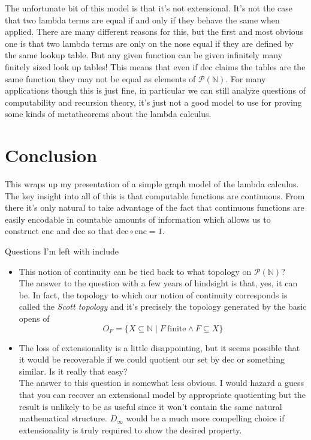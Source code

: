 \documentclass{amsart}
\newcommand{\enc}{\text{enc}}
\newcommand{\dec}{\text{dec}}
\begin{document}
The unfortunate bit of this model is that it's not extensional. It's
not the case that two lambda terms are equal if and only if they
behave the same when applied. There are many different reasons for
this, but the first and most obvious one is that two lambda terms are
only on the nose equal if they are defined by the same lookup
table. But any given function can be given infinitely many finitely
sized look up tables! This means that even if $\dec$ claims the tables
are the same function they may not be equal as elements of
$\mathcal{P}(\mathbb{N})$. For many applications though this is just
fine, in particular we can still analyze questions of computability
and recursion theory, it's just not a good model to use for proving
some kinds of metatheorems about the lambda calculus.

\section{Conclusion}

This wraps up my presentation of a simple graph model of the lambda
calculus. The key insight into all of this is that computable
functions are continuous. From there it's only natural to take
advantage of the fact that continuous functions are easily encodable
in countable amounts of information which allows us to construct
$\enc$ and $\dec$ so that $\dec \circ \enc = 1$.

Questions I'm left with include

\begin{itemize}
\item This notion of continuity can be tied back to what topology on
  $\mathcal{P}(\mathbb{N})$?\\

  The answer to the question with a few years of hindsight is that,
  yes, it can be. In fact, the topology to which our notion of continuity
  corresponds is called the \emph{Scott topology} and it's precisely
  the topology generated by the basic opens of
  \[
    O_F = \{X \subseteq \mathbb{N} \mid F\ \mathrm{finite} \mathrel{\wedge} F \subseteq X\}
  \]
\item The loss of extensionality is a little disappointing, but it
  seems possible that it would be recoverable if we could quotient our
  set by $\dec$ or something similar. Is it really that easy?\\

  The answer to this question is somewhat less obvious. I would hazard
  a guess that you can recover an extensional model by appropriate
  quotienting but the result is unlikely to be as useful since it
  won't contain the same natural mathematical structure. $D_\infty$
  would be a much more compelling choice if extensionality is truly
  required to show the desired property.
\end{itemize}
\end{document}
